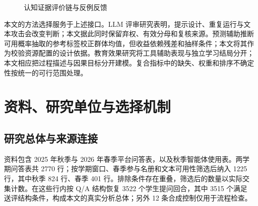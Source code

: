 \documentclass[withoutpreface,bwprint]{cumcmthesis}
\begin{document}
\begin{figure}[htbp]
\centering
{}
\caption{认知证据评价链与反例反馈}\label{fig:chain}
\end{figure}

本文的方法选择服务于上述接口。LLM 评审研究表明，提示设计、重复运行与文本攻击会改变判断\cite{gu2026_judge_survey,haldar2025_inconsistency,yamauchi2025_design,zhao2025_onetoken}；本文据此同时保留弃权、有效分母和复核来源。预测辅助推断可用概率抽取的参考标签校正群体均值，但收益依赖残差和抽样条件\cite{angelopoulos2023_ppi,angelopoulos2024_ppiplus,mani2025_nofreelunch}；本文将其作为校验资源配置的设计依据。教育效果研究将工具辅助表现与独立学习结局分开\cite{bastani2025_guardrails,he2024_metaanalysis}；本文相应把过程描述与因果目标分开建模。复合指标中的缺失、权重和排序不确定性按统一的可行范围处理\cite{oecd2008_composite}。

\section{资料、研究单位与选择机制}
\subsection{研究总体与来源连接}
资料包含 2025 年秋季与 2026 年春季平台问答表，以及秋季智能体使用表。两学期问答表共 2770 行；按学期窗口、春季参与名册和文本可用性筛选后纳入 1225 行，其中秋季 824 行、春季 401 行。排除条件存在重叠，筛选后的数量以实际交集计数。在这些行内按 Q/A 结构恢复 3522 个学生提问回合，其中 3515 个满足送评结构条件，构成本文的真实分析总体；另外 12 条合成控制仅用于流程检查。
\end{document}
